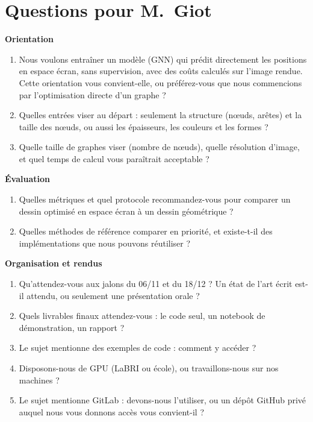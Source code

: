 \documentclass[11pt,a4paper]{article}
\begin{document}
\section{Questions pour M.~Giot}

\textbf{Orientation}
\begin{enumerate}
  \item Nous voulons entraîner un modèle (GNN) qui prédit directement les positions en espace écran, sans supervision, avec des coûts calculés sur l'image rendue. Cette orientation vous convient-elle, ou préférez-vous que nous commencions par l'optimisation directe d'un graphe ?
  \item Quelles entrées viser au départ : seulement la structure (nœuds, arêtes) et la taille des nœuds, ou aussi les épaisseurs, les couleurs et les formes ?
  \item Quelle taille de graphes viser (nombre de nœuds), quelle résolution d'image, et quel temps de calcul vous paraîtrait acceptable ?
\end{enumerate}

\textbf{Évaluation}
\begin{enumerate}[resume]
  \item Quelles métriques et quel protocole recommandez-vous pour comparer un dessin optimisé en espace écran à un dessin géométrique ?
  \item Quelles méthodes de référence comparer en priorité, et existe-t-il des implémentations que nous pouvons réutiliser ?
\end{enumerate}

\textbf{Organisation et rendus}
\begin{enumerate}[resume]
  \item Qu'attendez-vous aux jalons du 06/11 et du 18/12 ? Un état de l'art écrit est-il attendu, ou seulement une présentation orale ?
  \item Quels livrables finaux attendez-vous : le code seul, un notebook de démonstration, un rapport ?
  \item Le sujet mentionne des exemples de code : comment y accéder ?
  \item Disposons-nous de GPU (LaBRI ou école), ou travaillons-nous sur nos machines ?
  \item Le sujet mentionne GitLab : devons-nous l'utiliser, ou un dépôt GitHub privé auquel nous vous donnons accès vous convient-il ?
\end{enumerate}
\end{document}
